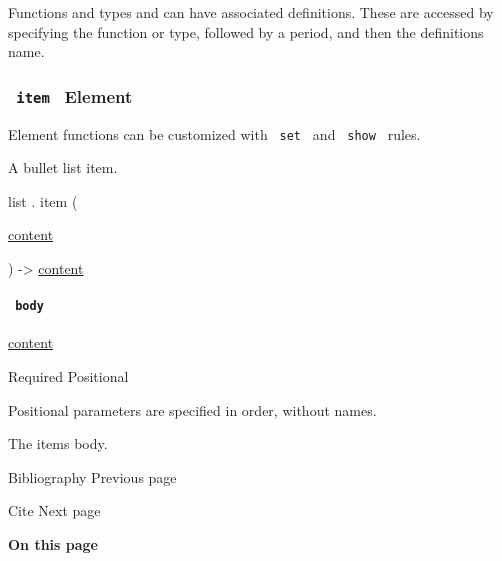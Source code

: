 \label{definitions-tooltip}
Functions and types and can have associated definitions. These are
accessed by specifying the function or type, followed by a period, and
then the definition\textquotesingle s name.

\subsubsection{\texorpdfstring{\texttt{\ item\ } {{ Element
}}}{ item   Element }}\label{definitions-item}

\label{definitions-item-element-tooltip}
Element functions can be customized with \texttt{\ set\ } and
\texttt{\ show\ } rules.

A bullet list item.

list { . } { item } (

{ \href{/docs/reference/foundations/content/}{content} }

) -\textgreater{} \href{/docs/reference/foundations/content/}{content}

\paragraph{\texorpdfstring{\texttt{\ body\ }}{ body }}\label{definitions-item-body}

\href{/docs/reference/foundations/content/}{content}

{Required} {{ Positional }}

\label{definitions-item-body-positional-tooltip}
Positional parameters are specified in order, without names.

The item\textquotesingle s body.

\href{/docs/reference/model/bibliography/}{\pandocbounded{}}

{ Bibliography } { Previous page }

\href{/docs/reference/model/cite/}{\pandocbounded{}}

{ Cite } { Next page }

\textbf{On this page}

